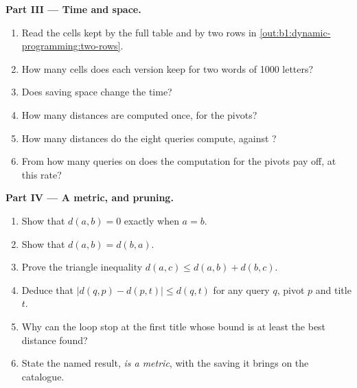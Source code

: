 \begin{problem}
\medskip\noindent\textbf{Part III --- Time and space.}
\begin{enumerate}[resume]
\item Read the cells kept by the full table and by two rows in \cref{out:b1:dynamic-programming:two-rows}.
\item How many cells does each version keep for two words of 1000 letters?
\item Does saving space change the time?
\item How many distances are computed once, for the pivots?
\item How many distances do the eight queries compute, against ?
\item From how many queries on does the computation for the pivots pay off, at this rate?
\end{enumerate}

\medskip\noindent\textbf{Part IV --- A metric, and pruning.}
\begin{enumerate}[resume]
\item Show that $d(a, b) = 0$ exactly when $a = b$.
\item Show that $d(a, b) = d(b, a)$.
\item Prove the triangle inequality $d(a, c) \leq d(a, b) + d(b, c)$.
\item Deduce that $|d(q, p) - d(p, t)| \leq d(q, t)$ for any query $q$, pivot $p$ and title $t$.
\item Why can the loop stop at the first title whose bound is at least the best distance found?
\item State the named result, \emph{ is a metric}, with the saving it brings on the catalogue.
\end{enumerate}
\end{problem}
